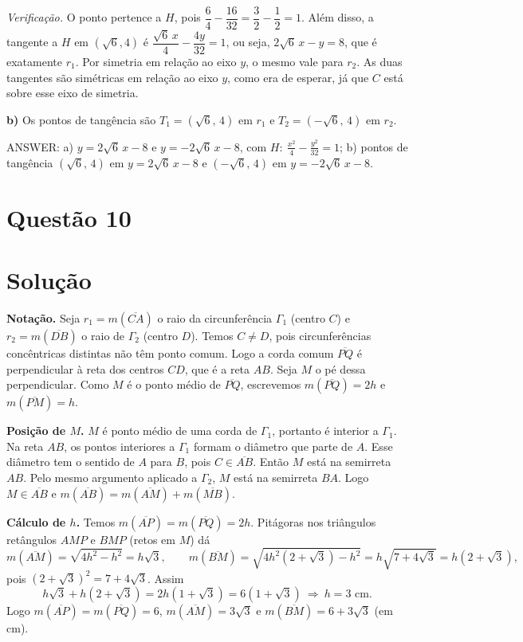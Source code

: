 \documentclass{article}%
\begin{document}
\emph{Verificação.} O ponto pertence a $H$, pois $\dfrac{6}{4}-\dfrac{16}{32}=\dfrac32-\dfrac12=1$. Além disso, a tangente a $H$ em $(\sqrt6,4)$ é $\dfrac{\sqrt6\,x}{4}-\dfrac{4y}{32}=1$, ou seja, $2\sqrt6\,x-y=8$, que é exatamente $r_1$. Por simetria em relação ao eixo $y$, o mesmo vale para $r_2$. As duas tangentes são simétricas em relação ao eixo $y$, como era de esperar, já que $C$ está sobre esse eixo de simetria.

\textbf{b)} Os pontos de tangência são $T_1=(\sqrt6,\,4)$ em $r_1$ e $T_2=(-\sqrt6,\,4)$ em $r_2$.

\medskip
ANSWER: a) $y=2\sqrt6\,x-8$ e $y=-2\sqrt6\,x-8$, com $H:\ \frac{x^2}{4}-\frac{y^2}{32}=1$; b) pontos de tangência $(\sqrt6,\,4)$ em $y=2\sqrt6\,x-8$ e $(-\sqrt6,\,4)$ em $y=-2\sqrt6\,x-8$.%
\newpage%
\section*{Questão 10}

\section*{Solução}

\textbf{Notação.} Seja $r_1=m(\overline{CA})$ o raio da circunferência $\Gamma_1$ (centro $C$) e $r_2=m(\overline{DB})$ o raio de $\Gamma_2$ (centro $D$). Temos $C\neq D$, pois circunferências concêntricas distintas não têm ponto comum. Logo a corda comum $\overline{PQ}$ é perpendicular à reta dos centros $CD$, que é a reta $AB$. Seja $M$ o pé dessa perpendicular. Como $M$ é o ponto médio de $\overline{PQ}$, escrevemos $m(\overline{PQ})=2h$ e $m(\overline{PM})=h$.

\textbf{Posição de $M$.} $M$ é ponto médio de uma corda de $\Gamma_1$, portanto é interior a $\Gamma_1$. Na reta $AB$, os pontos interiores a $\Gamma_1$ formam o diâmetro que parte de $A$. Esse diâmetro tem o sentido de $A$ para $B$, pois $C\in\overline{AB}$. Então $M$ está na semirreta $AB$. Pelo mesmo argumento aplicado a $\Gamma_2$, $M$ está na semirreta $BA$. Logo $M\in\overline{AB}$ e $m(\overline{AB})=m(\overline{AM})+m(\overline{MB})$.

\textbf{Cálculo de $h$.} Temos $m(\overline{AP})=m(\overline{PQ})=2h$. Pitágoras nos triângulos retângulos $AMP$ e $BMP$ (retos em $M$) dá
\[
m(\overline{AM})=\sqrt{4h^2-h^2}=h\sqrt3,\qquad
m(\overline{BM})=\sqrt{4h^2(2+\sqrt3)-h^2}=h\sqrt{7+4\sqrt3}=h(2+\sqrt3),
\]
pois $(2+\sqrt3)^2=7+4\sqrt3$. Assim
\[
h\sqrt3+h(2+\sqrt3)=2h(1+\sqrt3)=6(1+\sqrt3)\ \Rightarrow\ h=3\text{ cm}.
\]
Logo $m(\overline{AP})=m(\overline{PQ})=6$, $m(\overline{AM})=3\sqrt3$ e $m(\overline{BM})=6+3\sqrt3$ (em cm).
\end{document}
